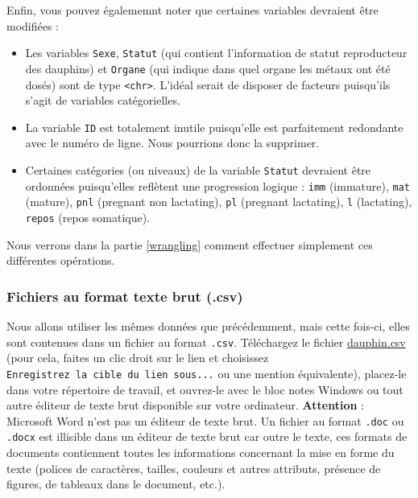 \documentclass[
  a4paper,
]{article}
\providecommand{\tightlist}{%
  \setlength{\itemsep}{0pt}\setlength{\parskip}{0pt}}
\begin{document}
Enfin, vous pouvez égalememnt noter que certaines variables devraient être modifiées :

\begin{itemize}
\tightlist
\item
  Les variables \texttt{Sexe}, \texttt{Statut} (qui contient l'information de statut reproducteur des dauphins) et \texttt{Organe} (qui indique dans quel organe les métaux ont été dosés) sont de type \texttt{\textless{}chr\textgreater{}}. L'idéal serait de disposer de facteurs puisqu'ils s'agit de variables catégorielles.
\item
  La variable \texttt{ID} est totalement inutile puisqu'elle est parfaitement redondante avec le numéro de ligne. Nous pourrions donc la supprimer.
\item
  Certaines catégories (ou niveaux) de la variable \texttt{Statut} devraient être ordonnées puisqu'elles reflètent une progression logique : \texttt{imm} (immature), \texttt{mat} (mature), \texttt{pnl} (pregnant non lactating), \texttt{pl} (pregnant lactating), \texttt{l} (lactating), \texttt{repos} (repos somatique).
\end{itemize}

Nous verrons dans la partie \ref{wrangling} comment effectuer simplement ces différentes opérations.

\hypertarget{plaintext}{%
\subsubsection{Fichiers au format texte brut (.csv)}\label{plaintext}}

Nous allons utiliser les mêmes données que précédemment, mais cette fois-ci, elles sont contenues dans un fichier au format \texttt{.csv}. Téléchargez le fichier \href{data/dauphin.csv}{dauphin.csv} (pour cela, faites un clic droit sur le lien et choisissez \texttt{Enregistrez\ la\ cible\ du\ lien\ sous...} ou une mention équivalente), placez-le dans votre répertoire de travail, et ouvrez-le avec le bloc notes Windows ou tout autre éditeur de texte brut disponible sur votre ordinateur. \textbf{Attention} : Microsoft Word n'est pas un éditeur de texte brut. Un fichier au format \texttt{.doc} ou \texttt{.docx} est illisible dans un éditeur de texte brut car outre le texte, ces formats de documents contiennent toutes les informations concernant la mise en forme du texte (polices de caractères, tailles, couleurs et autres attributs, présence de figures, de tableaux dans le document, etc.).
\end{document}

